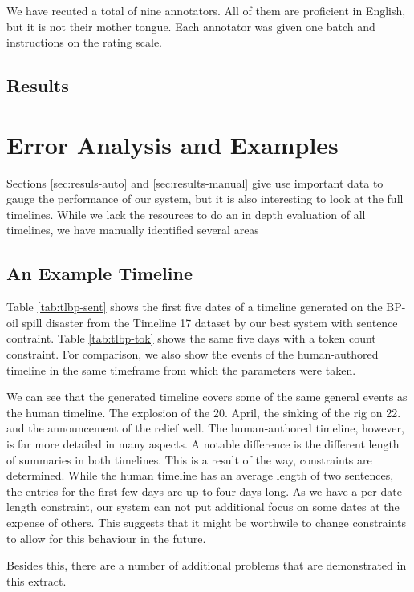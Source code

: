 \documentclass[a4paper,BCOR=10mm]{report}
\numberwithin{lemma}{chapter}
\numberwithin{definition}{chapter}
\begin{document}
We have recuted a total of nine annotators. All of them are proficient in English, but it is not their mother tongue.
Each annotator was given one batch and instructions on the rating scale.

\section{Results}

\chapter{Error Analysis and Examples}

Sections \ref{sec:resuls-auto} and \ref{sec:results-manual} give use important data to gauge the performance of our system, but it is also interesting to look at the full timelines.
While we lack the resources to do an in depth evaluation of all timelines, we have manually identified several areas

\section{An Example Timeline}

Table \ref{tab:tlbp-sent} shows the first five dates of a timeline generated on the BP-oil spill disaster from the Timeline 17 dataset by our best system with sentence contraint. Table \ref{tab:tlbp-tok} shows the same five days with a token count constraint.
For comparison, we also show the events of the human-authored timeline in the same timeframe from which the parameters were taken.

We can see that the generated timeline covers some of the same general events as the human timeline.
The explosion of the 20. April, the sinking of the rig on 22. and the announcement of the relief well. The human-authored timeline, however, is far more detailed in many aspects.
A notable difference is the different length of summaries in both timelines. This is a result of the way, constraints are determined. While the human timeline has an average length of two sentences, the entries for the first few days are up to four days long.
As we have a per-date-length constraint, our system can not put additional focus on some dates at the expense of others. This suggests that it might be worthwile to change constraints to allow for this behaviour in the future.

Besides this, there are a number of additional problems that are demonstrated in this extract.
\end{document}

